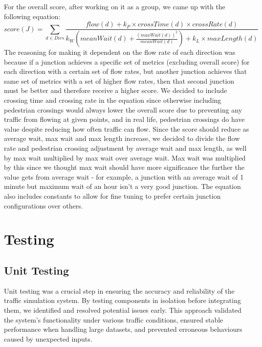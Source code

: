 \documentclass{article}
\begin{document}
    For the overall score, after working on it as a group, we came up with the following equation:
    $$score(J) = \sum_{d \in Dirs}\frac{flow(d) + k_P\times crossTime(d) \times crossRate(d)}{k_W (meanWait(d)+\frac{(maxWait(d))^2}{meanWait(d)}) + k_L\times maxLength(d)}$$
    The reasoning for making it dependent on the flow rate of each direction was because if a junction achieves a specific set of metrics (excluding overall score) for each direction with a certain set of flow rates, but another junction achieves that same set of metrics with a set of higher flow rates, then that second junction must be better and therefore receive a higher score. We decided to include crossing time and crossing rate in the equation since otherwise including pedestrian crossings would always lower the overall score due to preventing any traffic from flowing at given points, and in real life, pedestrian crossings do have value despite reducing how often traffic can flow. Since the score should reduce as average wait, max wait and max length increase, we decided to divide the flow rate and pedestrian crossing adjustment by average wait and max length, as well by max wait multiplied by max wait over average wait. Max wait was multiplied by this since we thought max wait should have more significance the further the value gets from average wait - for example, a junction with an average wait of 1 minute but maximum wait of an hour isn’t a very good junction. The equation also includes constants to allow for fine tuning to prefer certain junction configurations over others.


    \section{Testing}

    \subsection{Unit Testing}
    Unit testing was a crucial step in ensuring the accuracy and reliability of the traffic simulation system. By testing components in isolation before integrating them, we identified and resolved potential issues early. This approach validated the system’s functionality under various traffic conditions, ensured stable performance when handling large datasets, and prevented erroneous behaviours caused by unexpected inputs.
\end{document}
